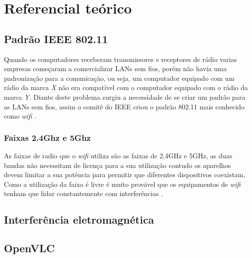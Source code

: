 \section{Referencial teórico}  

\subsection{Padrão IEEE 802.11}

Quando os computadores receberam transmissores e receptores de rádio varias empresas começaram a comercializar LANs sem fios, porém não havia uma padronização para a comunicação, ou seja, um computador equipado com um rádio da marca \emph{X} não era compatível com o computador equipado com o rádio da marca \emph{Y}. Diante deste problema surgiu a necessidade de se criar um padrão para as LANs sem fios, assim o comitê do IEEE criou o padrão 802.11 mais conhecido como \textit{wifi} \cite{tanenbaum}.

\subsubsection{Faixas 2.4Ghz e 5Ghz}

As faixas de radio que o \textit{wifi} utiliza são as faixas de 2,4GHz e 5GHz, as duas bandas não necessitam de licença para a sua utilização contudo os aparelhos devem limitar a sua potência para permitir que diferentes dispositivos coexistam. Como a utilização da faixa é livre é muito provável que os equipamentos de \textit{wifi} tenham que lidar constantemente com interferências \cite{tanenbaum}.

\subsection{Interferência eletromagnética}

\subsection{OpenVLC}
